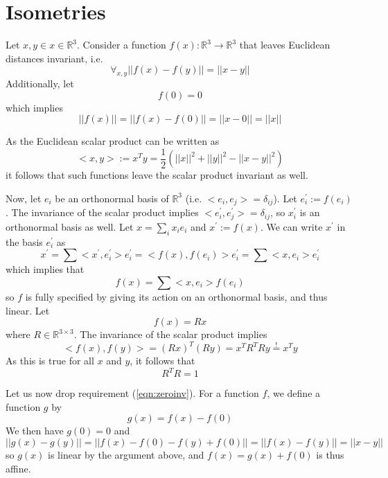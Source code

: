 \documentclass{article}
\begin{document}
\section{Isometries}
Let $x, y \in x \in \mathbb{R}^3$. Consider a function $f(x): \mathbb{R}^3 \to \mathbb{R}^3$ that leaves Euclidean distances invariant, i.e.
\begin{equation}
\forall_{x, y} ||f(x) - f(y)|| = ||x - y||
\end{equation}
Additionally, let
\begin{equation}
\label{eqn:zeroinv}
f(0) = 0
\end{equation}
which implies
\begin{equation}
||f(x)|| = ||f(x) - f(0)|| = ||x - 0|| = ||x||
\end{equation}

As the Euclidean scalar product can be written as
\begin{equation}
<x, y> := x^T y = \frac{1}{2} (||x||^2 + ||y||^2 - ||x - y||^2)
\end{equation}
it follows that such functions leave the scalar product invariant as well.

Now, let $e_i$ be an orthonormal basis of $\mathbb{R}^3$ (i.e. $<e_i,e_j> = \delta_{ij}$). Let $e^\prime_i := f(e_i)$. The invariance of the scalar product implies $<e^\prime_i, e^\prime_j> = \delta_{ij}$, so ${x^\prime_i}$ is an orthonormal basis as well. Let $x = \sum_i x_i e_i$ and $x^\prime :=  f(x)$. We can write $x^\prime$ in the basis ${e^\prime_i}$ as
\begin{equation}
x^\prime = \sum <x^\prime, e^\prime_i> e^\prime_i = <f(x), f(e_i)> e^\prime_i = \sum <x, e_i> e^\prime_i
\end{equation}
which implies that
\begin{equation}
f(x) = \sum <x, e_i> f(e_i)
\end{equation}
so $f$ is fully specified by giving its action on an orthonormal basis, and thus linear. Let
\begin{equation}
f(x) = Rx
\end{equation}
where $R \in \mathbb{R}^{3 \times 3}$. The invariance of the scalar product implies
\begin{equation}
<f(x), f(y)> = (Rx)^T(Ry) = x^T R^T R y \stackrel{!}{=} x^T y
\end{equation}
As this is true for all $x$ and $y$, it follows that
\begin{equation}
R^T R = 1
\end{equation}

Let us now drop requirement (\ref{eqn:zeroinv}). For a function $f$, we define a function $g$ by
\begin{equation}
g(x) = f(x) - f(0)
\end{equation}
We then have $g(0) = 0$ and
\begin{equation}
||g(x) - g(y)|| = ||f(x) - f(0) - f(y) + f(0)|| = ||f(x) - f(y)|| = ||x - y||
\end{equation}
so $g(x)$ is linear by the argument above, and $f(x) = g(x) + f(0)$ is thus affine.
\end{document}
